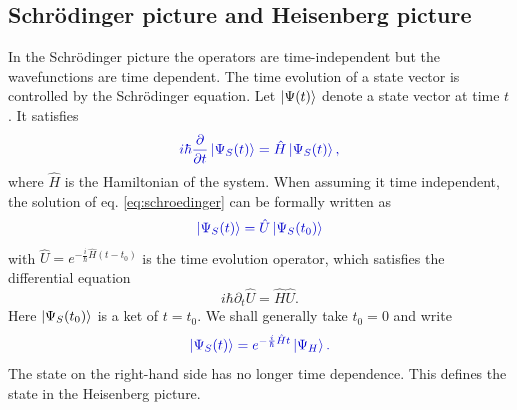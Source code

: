 \documentclass[12pt, titlepage]{article}
\begin{document}
\subsection{Schrödinger picture and Heisenberg picture}
In the Schrödinger picture the operators are time-independent but the wavefunctions are time dependent. The time evolution of a state vector is controlled by the Schrödinger equation. Let $ \ket{\Psi(t)} $ denote a state vector at time $ t $. It satisfies
\begin{equation}\label{eq:schroedinger}
\textcolor[RGB]{0,0,204}{
i \hbar \frac{\partial }{\partial t} \ket{\Psi_{S}(t)} =
\hat{H} \ket{\Psi_{S}(t)},
}
\end{equation}
where $ \hat{H} $ is the Hamiltonian of the system. When assuming it time independent, the solution of eq. \eqref{eq:schroedinger} can be formally written as 
\begin{equation}\label{eq:time_ev_op_schr}
\textcolor[RGB]{0,0,204}{
\ket{\Psi_{S}(t)} 
=\hat{U}\ket{\Psi_{S}(t_0)}
}
\end{equation}
with $ \hat{U} = e^{-\frac{i}{\hbar}\hat{H}(t-t_{0})} $ is the time evolution operator, which satisfies the differential equation 
\begin{equation}\label{evo_U_1}
i\hbar\partial_{t}\hat{U}=\hat{H}\hat{U}
. 
\end{equation}
 Here $ \ket{\Psi_{S}(t_0)} $ is a ket of $ t=t_{0} $. We shall generally take $ t_{0}=0 $ and write
\begin{equation}\label{eq:phi_s_and_phi_h}
\textcolor[RGB]{0,0,204}{
\ket{\Psi_{S}(t)} 
= e^{-\frac{i}{\hbar}\hat{H}t}
\ket{\Psi_{H}}.
}
\end{equation}
The state on the right-hand side has no longer time dependence. This defines the  state in the Heisenberg picture.
\end{document}
